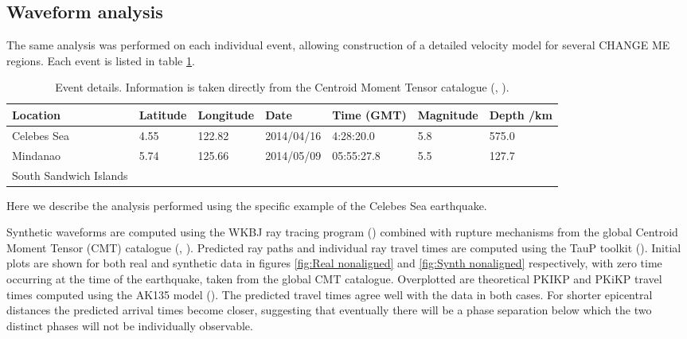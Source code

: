 \documentclass[11pt,a4paper]{article}
\begin{document}
\subsection{Waveform analysis}
\label{sec:Waveforms}
The same analysis was performed on each individual event, allowing construction of a detailed velocity model for several CHANGE ME regions. Each event is listed in table \ref{tab:Events}.
\begin{table}
\centering
\begin{tabular}{| l | l | l | l | l | l | l |}
	\hline Location				& Latitude	& Longitude	& Date		& Time (GMT)	& Magnitude	& Depth /km 	\\
	\hline Celebes Sea			& 4.55	& 122.82		& 2014/04/16	& 4:28:20.0	& 5.8			& 575.0  		\\ 
	\hline Mindanao			& 5.74	& 125.66		& 2014/05/09	& 05:55:27.8	& 5.5			& 127.7		\\
	\hline South Sandwich Islands 	&		& 			& 			& 			& 			&			\\\hline	
\end{tabular}
\caption{Event details. Information is taken directly from the Centroid Moment Tensor catalogue (\cite{Dziewonski1981}, \cite{Ekstrom2012}).}
\label{tab:Events}
\end{table}
Here we describe the analysis performed using the specific example of the Celebes Sea earthquake.

Synthetic waveforms are computed using the WKBJ ray tracing program (\cite{Chapman1976}) combined with rupture mechanisms from the global Centroid Moment Tensor (CMT) catalogue (\cite{Dziewonski1981}, \cite{Ekstrom2012}). Predicted ray paths and individual ray travel times are computed using the TauP toolkit (\cite{Crotwell1999}). Initial plots are shown for both real and synthetic data in figures \ref{fig:Real nonaligned} and \ref{fig:Synth nonaligned} respectively, with zero time occurring at the time of the earthquake, taken from the global CMT catalogue. Overplotted are theoretical PKIKP and PKiKP travel times computed using the AK135 model (\cite{Kennett1995b}). The predicted travel times agree well with the data in both cases.  For shorter epicentral distances the predicted arrival times become closer, suggesting that eventually there will be a phase separation below which the two distinct phases will not be individually observable.
\end{document}
